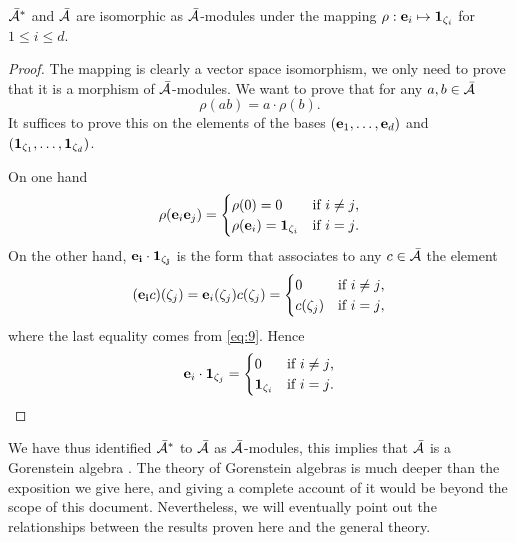 \begin{proposition}
  \label{th:gorenstein}
  $\bar{\mathcal{A}}^\ast$ and $\bar{\mathcal{A}}$ are isomorphic as
  $\bar{\mathcal{A}}$-modules under the mapping
  $\rho:\mathbf{e}_i\mapsto\mathbf{1}_{\zeta_i}$ for $1\le i\le d$.
\end{proposition}
\begin{proof}
  The mapping is clearly a vector space isomorphism, we only need to
  prove that it is a morphism of $\bar{\mathcal{A}}$-modules. We want
  to prove that for any $a,b\in\bar{\mathcal{A}}$
  \[\rho(ab) = a\cdot\rho(b)\text{.}\]
  It suffices to prove this on the elements of the bases
  $(\mathbf{e}_1,\ldots,\mathbf{e}_d)$ and
  $(\mathbf{1}_{\zeta_1},\ldots,\mathbf{1}_{\zeta_d})$.

  On one hand
  \begin{equation}
    \label{eq:12}
    \rho(\mathbf{e}_i\mathbf{e}_j)=
    \begin{cases}
      \rho(0)=0 &\text{if $i\ne j$,}\\
      \rho(\mathbf{e}_i)=\mathbf{1}_{\zeta_i} &\text{if $i=j$.}
    \end{cases}
  \end{equation}
  On the other hand, $\mathbf{e_i}\cdot\mathbf{1_{\zeta_j}}$ is the form
  that associates to any $c\in\bar{\mathcal{A}}$ the element
  \begin{equation}
    \label{eq:13}
    (\mathbf{e_i}c)(\zeta_j) = \mathbf{e}_i(\zeta_j)c(\zeta_j) = 
    \begin{cases}
      0 &\text{if $i\ne j$,}\\
      c(\zeta_j) &\text{if $i=j$,}
    \end{cases}
  \end{equation}
  where the last equality comes from \eqref{eq:9}. Hence
  \begin{equation}
    \label{eq:14}
    \mathbf{e}_i\cdot\mathbf{1}_{\zeta_j}=
    \begin{cases}
      0 &\text{if $i\ne j$,}\\
      \mathbf{1}_{\zeta_i} &\text{if $i=j$.}
    \end{cases}
  \end{equation}
\end{proof}

\begin{nota}
  We have thus identified $\bar{\mathcal{A}}^\ast$ to
  $\bar{\mathcal{A}}$ as $\bar{\mathcal{A}}$-modules, this implies that
  $\bar{\mathcal{A}}$ is a Gorenstein algebra \cite[Chapter
  8]{mourrain+elkadi}. The theory of Gorenstein algebras is much
  deeper than the exposition we give here, and giving a complete
  account of it would be beyond the scope of this
  document. Nevertheless, we will eventually point out the
  relationships between the results proven here and the general
  theory.
\end{nota}

